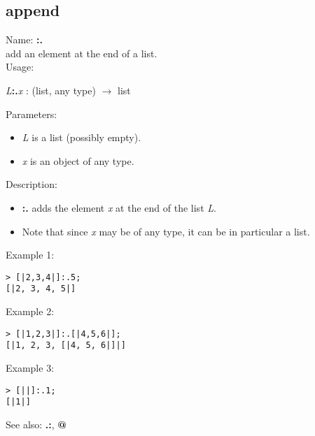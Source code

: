 \subsection{ append }
\noindent Name: \textbf{:.}\\
add an element at the end of a list.\\

\noindent Usage: 
\begin{center}
\emph{L}\textbf{:.}\emph{x} : (\textsf{list}, \textsf{any type}) $\rightarrow$ \textsf{list}\\
\end{center}
Parameters: 
\begin{itemize}
\item \emph{L} is a list (possibly empty).
\item \emph{x} is an object of any type.
\end{itemize}
\noindent Description: \begin{itemize}

\item \textbf{:.} adds the element \emph{x} at the end of the list \emph{L}.

\item Note that since \emph{x} may be of any type, it can be in particular a list.
\end{itemize}
\noindent Example 1: 
\begin{center}\begin{minipage}{15cm}\begin{Verbatim}[frame=single]
> [|2,3,4|]:.5;
[|2, 3, 4, 5|]
\end{Verbatim}
\end{minipage}\end{center}
\noindent Example 2: 
\begin{center}\begin{minipage}{15cm}\begin{Verbatim}[frame=single]
> [|1,2,3|]:.[|4,5,6|];
[|1, 2, 3, [|4, 5, 6|]|]
\end{Verbatim}
\end{minipage}\end{center}
\noindent Example 3: 
\begin{center}\begin{minipage}{15cm}\begin{Verbatim}[frame=single]
> [||]:.1;
[|1|]
\end{Verbatim}
\end{minipage}\end{center}
See also: \textbf{.:}, \textbf{@}
